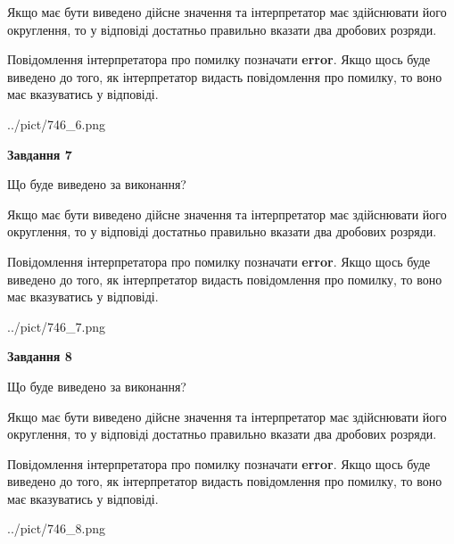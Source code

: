 \documentclass[12pt, ukrainian]{article}
\begin{document}
{\begin {Large}
Якщо має бути виведено дійсне значення та інтерпретатор має здійснювати його округлення, 
то у відповіді достатньо правильно вказати два дробових розряди.

Повідомлення інтерпретатора про помилку позначати \textbf{error}.
Якщо щось буде виведено до того, як інтерпретатор видасть повідомлення про помилку, 
то воно має вказуватись у відповіді. \par

\begin{center}
	{../pict/746_6.png}
\end{center}
\newpage

{\begin {center}\textbf{Завдання 7}\end {center}}\par
Що буде виведено за виконання? \par

Якщо має бути виведено дійсне значення та інтерпретатор має здійснювати його округлення, 
то у відповіді достатньо правильно вказати два дробових розряди.

Повідомлення інтерпретатора про помилку позначати \textbf{error}.
Якщо щось буде виведено до того, як інтерпретатор видасть повідомлення про помилку, 
то воно має вказуватись у відповіді. \par

\begin{center}
	{../pict/746_7.png}
\end{center}
\newpage

{\begin {center}\textbf{Завдання 8}\end {center}}\par
Що буде виведено за виконання? \par

Якщо має бути виведено дійсне значення та інтерпретатор має здійснювати його округлення, 
то у відповіді достатньо правильно вказати два дробових розряди.

Повідомлення інтерпретатора про помилку позначати \textbf{error}.
Якщо щось буде виведено до того, як інтерпретатор видасть повідомлення про помилку, 
то воно має вказуватись у відповіді. \par

\begin{center}
	{../pict/746_8.png}
\end{center}
\newpage


\end{Large}}
\end{document}
